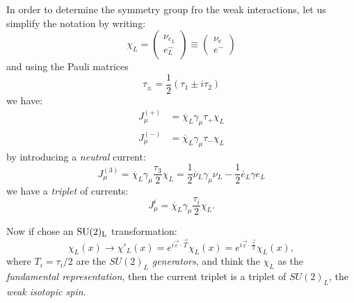 In order to determine the symmetry group fro the weak interactions, let us
simplify the notation by writing:
\begin{equation}
  \chi_L =
  \begin{pmatrix}
    \nu_{e_L} \\ e^-_L
  \end{pmatrix}
  \equiv
  \begin{pmatrix}
    \nu_e \\ e^-
  \end{pmatrix}
\end{equation}
and using the Pauli matrices
\begin{equation}
  \tau_\pm = \frac{1}{2}( \tau_1 \pm i \tau_2)
\end{equation}
we have:
\begin{equation}
  \begin{split}
    J_\mu^{(+)} &= \overbar{\chi}_L \gamma_\mu \tau_+ \chi_L \\
    J_\mu^{(-)} &= \overbar{\chi}_L \gamma_\mu \tau_- \chi_L
  \end{split}
\end{equation}
by introducing a \emph{neutral} current:
\begin{equation}
  J_\mu^{(3)} = \overbar{\chi}_L \gamma_\mu \frac{\tau_3}{2} \chi_L = \frac{1}{2}
  \overbar{\nu}_L \gamma_\mu \nu_L - \frac{1}{2} \overbar{e}_L \gamma e_L
\end{equation}
we have a \emph{triplet} of currents:
\begin{equation}
  \label{eq:1}
  J_\mu^i = \overbar{\chi}_L \gamma_\mu \frac{\tau_i}{2} \chi_L.
\end{equation}

Now if chose an $\mathrm{SU}(2)_\mathrm{L}$ transformation:
\begin{equation}
  \chi_L (x) \to \chi'_L (x) = e^{i \vec{\varepsilon} \cdotp \vec{T}} \chi_L(x)
  = e^{i \vec{\varepsilon} \cdotp \frac{\vec{\tau}}{2}} \chi_L(x),
\end{equation}
where $T_i = \tau_i / 2$ are the $SU(2)_L$ \emph{generators}, and think the
$\chi_L$ as the \emph{fundamental representation}, then the current triplet is a
triplet of $SU(2)_L$, the \emph{weak isotopic spin}.


